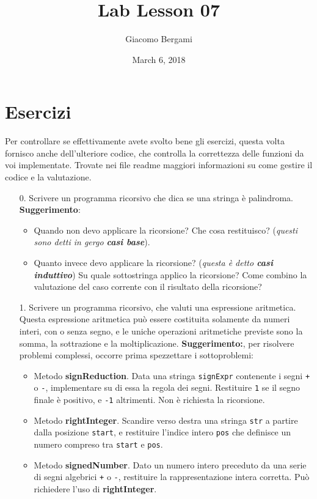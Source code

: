 \documentclass[]{scrartcl}
\title{Lab Lesson 07}
\date{March 6, 2018}
\author{Giacomo Bergami}
\begin{document}
\maketitle
\section*{Esercizi}
Per controllare se effettivamente avete svolto bene gli esercizi, questa volta fornisco anche dell'ulteriore codice, che controlla la correttezza delle funzioni da voi implementate. Trovate nei file readme maggiori informazioni su come gestire il codice e la valutazione.


\begin{enumerate}
\item[0.] Scrivere un programma ricorsivo che dica se una stringa è palindroma. \textbf{Suggerimento}:
\begin{itemize}
	\item Quando non devo applicare la ricorsione? Che cosa restituisco? (\textit{questi sono detti in gergo \textbf{casi base}}).
	\item Quanto invece devo applicare la ricorsione? (\textit{questa è detto \textbf{casi induttivo}}) Su quale sottostringa applico la ricorsione? Come combino la valutazione del caso corrente con il risultato della ricorsione?
\end{itemize}
\item[1.] Scrivere un programma ricorsivo, che valuti una espressione aritmetica. Questa espressione aritmetica può essere costituita solamente da numeri interi, con o senza segno, e le uniche operazioni aritmetiche previste sono la somma, la sottrazione e la moltiplicazione. \textbf{Suggerimento:}, per risolvere problemi complessi, occorre prima spezzettare i sottoproblemi:
\begin{itemize}
	\item Metodo \textbf{signReduction}. Data una stringa \texttt{signExpr} contenente i segni \texttt{+} o \texttt{-}, implementare su di essa la regola dei segni. Restituire \texttt{1} se il segno finale è positivo, e \texttt{-1} altrimenti. {\color{red} Non è richiesta la ricorsione}.
	\item Metodo \textbf{rightInteger}. Scandire verso destra una stringa \texttt{str} a partire dalla posizione \texttt{start}, e restituire l'indice intero \texttt{pos} che definisce un numero compreso tra \texttt{start} e \texttt{pos}.
	\item Metodo \textbf{signedNumber}. Dato un numero intero preceduto da una serie di segni algebrici \texttt{+} o \texttt{-}, restituire la rappresentazione intera corretta. {\color{red}Può richiedere l'uso di \textbf{rightInteger}}.

\end{itemize}
\end{enumerate}
\end{document}
